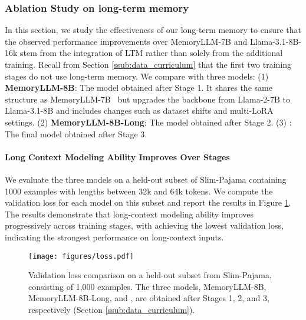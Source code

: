 \subsubsection{Ablation Study on long-term memory}
\label{ssub:ablation_study_on_long_term_memory}
\vspace{-3pt}
In this section, we study the effectiveness of our long-term memory to ensure that the observed performance improvements over MemoryLLM-7B and Llama-3.1-8B-16k stem from the integration of LTM rather than solely from the additional training. Recall from Section \ref{ssub:data_curriculum} that the first two training stages do not use long-term memory. We compare with three models: (1) \textbf{MemoryLLM-8B}: The model obtained after Stage 1. It shares the same structure as MemoryLLM-7B~\citep{memoryllm} but upgrades the backbone from Llama-2-7B to Llama-3.1-8B and includes changes such as dataset shifts and multi-LoRA settings. (2) \textbf{MemoryLLM-8B-Long}: The model obtained after Stage 2. (3) \textbf{\ours}: The final model obtained after Stage 3. 

\vspace{-5pt}
\paragraph{Long Context Modeling Ability Improves Over Stages}
We evaluate the three models on a held-out subset of Slim-Pajama containing 1000 examples with lengths between 32k and 64k tokens. We compute the validation loss for each model on this subset and report the results in Figure \ref{fig:loss_comparison}. The results demonstrate that long-context modeling ability improves progressively across training stages, with \ours achieving the lowest validation loss, indicating the strongest performance on long-context inputs. 

\begin{figure}[t]
    \centering
    \vspace{-10pt}
    \texttt{[image: figures/loss.pdf]}
    \vspace{-20pt}
    \caption{Validation loss comparison on a held-out subset from Slim-Pajama, consisting of 1,000 examples. The three models, MemoryLLM-8B, MemoryLLM-8B-Long, and \ours, are obtained after Stages 1, 2, and 3, respectively (Section \ref{ssub:data_curriculum}).} 
    \label{fig:loss_comparison}
\end{figure}

\vspace{-5pt}
